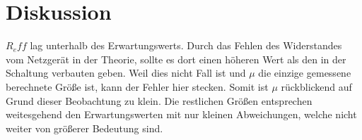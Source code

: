 \section{Diskussion}
\label{sec:Diskussion}
$R_eff$ lag unterhalb des Erwartungswerts. 
Durch das Fehlen des Widerstandes vom Netzgerät in der Theorie, sollte es dort einen höheren Wert als den in der Schaltung verbauten geben.
Weil dies nicht Fall ist und $\mu$ die einzige gemessene berechnete Größe ist, kann der Fehler hier stecken.
Somit ist $\mu$ rückblickend auf Grund dieser Beobachtung zu klein.
Die restlichen Größen entsprechen weitesgehend den Erwartungswerten mit nur kleinen Abweichungen, welche nicht weiter von größerer Bedeutung sind.